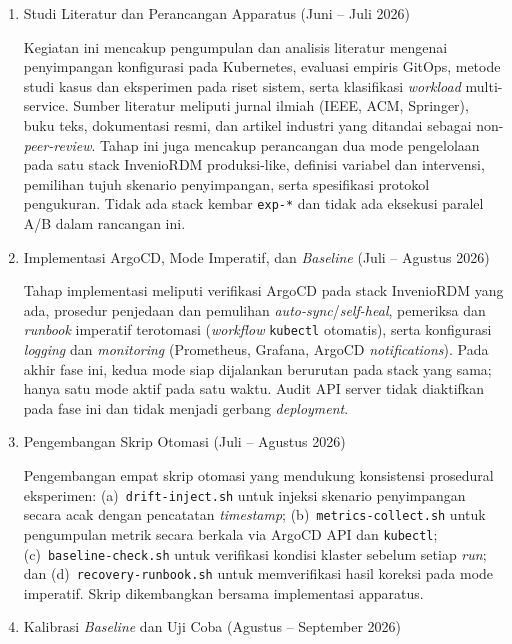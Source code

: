 \begin{enumerate}
    \item Studi Literatur dan Perancangan Apparatus (Juni -- Juli 2026)
    
    Kegiatan ini mencakup pengumpulan dan analisis literatur mengenai penyimpangan konfigurasi pada Kubernetes, evaluasi empiris GitOps, metode studi kasus dan eksperimen pada riset sistem, serta klasifikasi \textit{workload} multi-service. Sumber literatur meliputi jurnal ilmiah (IEEE, ACM, Springer), buku teks, dokumentasi resmi, dan artikel industri yang ditandai sebagai non-\textit{peer-review}. Tahap ini juga mencakup perancangan dua mode pengelolaan pada satu stack InvenioRDM produksi-like, definisi variabel dan intervensi, pemilihan tujuh skenario penyimpangan, serta spesifikasi protokol pengukuran. Tidak ada stack kembar \texttt{exp-*} dan tidak ada eksekusi paralel A/B dalam rancangan ini.
    
    \item Implementasi ArgoCD, Mode Imperatif, dan \textit{Baseline} (Juli -- Agustus 2026)
    
    Tahap implementasi meliputi verifikasi ArgoCD pada stack InvenioRDM yang ada, prosedur penjedaan dan pemulihan \textit{auto-sync}/\textit{self-heal}, pemeriksa dan \textit{runbook} imperatif terotomasi (\textit{workflow} \texttt{kubectl} otomatis), serta konfigurasi \textit{logging} dan \textit{monitoring} (Prometheus, Grafana, ArgoCD \textit{notifications}). Pada akhir fase ini, kedua mode siap dijalankan berurutan pada stack yang sama; hanya satu mode aktif pada satu waktu. Audit API server tidak diaktifkan pada fase ini dan tidak menjadi gerbang \textit{deployment}.
    
    \item Pengembangan Skrip Otomasi (Juli -- Agustus 2026)
    
    Pengembangan empat skrip otomasi yang mendukung konsistensi prosedural eksperimen: (a)~\texttt{drift-inject.sh} untuk injeksi skenario penyimpangan secara acak dengan pencatatan \textit{timestamp}; (b)~\texttt{metrics-collect.sh} untuk pengumpulan metrik secara berkala via ArgoCD API dan \texttt{kubectl}; (c)~\texttt{baseline-check.sh} untuk verifikasi kondisi klaster sebelum setiap \textit{run}; dan (d)~\texttt{recovery-runbook.sh} untuk memverifikasi hasil koreksi pada mode imperatif. Skrip dikembangkan bersama implementasi apparatus.
    
    \item Kalibrasi \textit{Baseline} dan Uji Coba (Agustus -- September 2026)
    

\end{enumerate}
